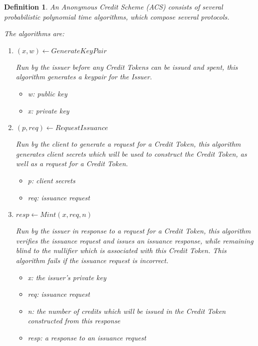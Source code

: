 \documentclass{article}
\newtheorem{definition}{Definition}
\begin{document}
\begin{definition}

An Anonymous Credit Scheme (ACS) consists of several probabilistic polynomial
time algorithms, which compose several protocols. 

The algorithms are:

\begin{enumerate}

    \item $(x, w) \leftarrow GenerateKeyPair$

        Run by the issuer before any Credit Tokens can be issued and spent,
        this algorithm generates a keypair for the Issuer.

    \begin{itemize}
        \item w: public key
        \item x: private key
    \end{itemize}

    \item $(p, req) \leftarrow RequestIssuance$

        Run by the client to generate a request for a Credit Token, this
        algorithm generates client secrets which will be used to construct the
        Credit Token, as well as a request for a Credit Token.

    \begin{itemize}
        \item p: client secrets
        \item req: issuance request
    \end{itemize}

    \item $resp \leftarrow Mint(x, req, n)$

        Run by the issuer in response to a request for a Credit Token, this
        algorithm verifies the issuance request and issues an issuance
        response, while remaining blind to the nullifier which is associated
        with this Credit Token. This algorithm fails if the issuance request is
        incorrect.

    \begin{itemize}
        \item x: the issuer's private key
        \item req: issuance request
        \item n: the number of credits which will be issued in the Credit Token
              constructed from this response
        \item resp: a response to an issuance request
    \end{itemize}


\end{enumerate}
\end{definition}
\end{document}
